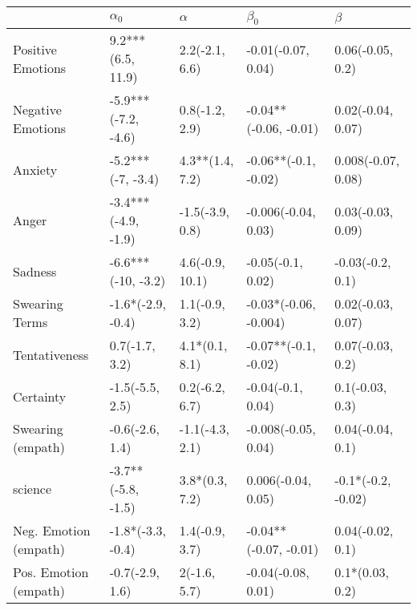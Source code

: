 \begin{tabular}{lllll}
\toprule
{} &           $\alpha_0$ &         $\alpha$ &              $\beta_0$ &             $\beta$ \\
\midrule
Positive Emotions     &    9.2***(6.5, 11.9) &   2.2(-2.1, 6.6) &     -0.01(-0.07, 0.04) &    0.06(-0.05, 0.2) \\
Negative Emotions     &  -5.9***(-7.2, -4.6) &   0.8(-1.2, 2.9) &  -0.04**(-0.06, -0.01) &   0.02(-0.04, 0.07) \\
Anxiety               &    -5.2***(-7, -3.4) &  4.3**(1.4, 7.2) &   -0.06**(-0.1, -0.02) &  0.008(-0.07, 0.08) \\
Anger                 &  -3.4***(-4.9, -1.9) &  -1.5(-3.9, 0.8) &    -0.006(-0.04, 0.03) &   0.03(-0.03, 0.09) \\
Sadness               &   -6.6***(-10, -3.2) &  4.6(-0.9, 10.1) &      -0.05(-0.1, 0.02) &    -0.03(-0.2, 0.1) \\
Swearing Terms        &    -1.6*(-2.9, -0.4) &   1.1(-0.9, 3.2) &  -0.03*(-0.06, -0.004) &   0.02(-0.03, 0.07) \\
Tentativeness         &       0.7(-1.7, 3.2) &   4.1*(0.1, 8.1) &   -0.07**(-0.1, -0.02) &    0.07(-0.03, 0.2) \\
Certainty             &      -1.5(-5.5, 2.5) &   0.2(-6.2, 6.7) &      -0.04(-0.1, 0.04) &     0.1(-0.03, 0.3) \\
Swearing (empath)     &      -0.6(-2.6, 1.4) &  -1.1(-4.3, 2.1) &    -0.008(-0.05, 0.04) &    0.04(-0.04, 0.1) \\
science               &   -3.7**(-5.8, -1.5) &   3.8*(0.3, 7.2) &     0.006(-0.04, 0.05) &  -0.1*(-0.2, -0.02) \\
Neg. Emotion (empath) &    -1.8*(-3.3, -0.4) &   1.4(-0.9, 3.7) &  -0.04**(-0.07, -0.01) &    0.04(-0.02, 0.1) \\
Pos. Emotion (empath) &      -0.7(-2.9, 1.6) &     2(-1.6, 5.7) &     -0.04(-0.08, 0.01) &     0.1*(0.03, 0.2) \\
\bottomrule
\end{tabular}

